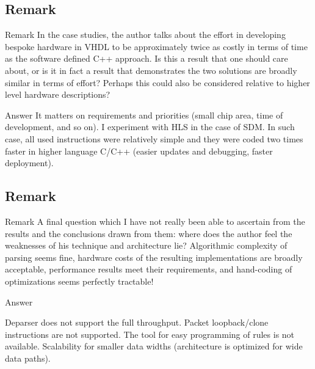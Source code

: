 \subsection{Remark \theRemarkCounter}
\begin{frame}[allowframebreaks]
    \begin{block}{Remark \theRemarkCounter}
       In the case studies, the author talks about the effort in developing bespoke hardware in
       VHDL to be approximately twice as costly in terms of time as the software defined C++
       approach. Is this a result that one should care about, or is it in fact a result that demonstrates
       the two solutions are broadly similar in terms of effort? Perhaps this could also be considered
       relative to higher level hardware descriptions?
    \end{block}
    
    \begin{exampleblock}{Answer}
        It matters on requirements and priorities (small chip area, time of development, and so on).
        I experiment with HLS in the case of SDM. In such case, all used instructions were relatively 
        simple and they were coded two times faster in higher language C/C++ (easier updates and debugging, faster deployment).
    \end{exampleblock}
\end{frame}

\subsection{Remark \theRemarkCounter}
\begin{frame}[allowframebreaks]
    \begin{block}{Remark \theRemarkCounter}
       A final question which I have not really been able to ascertain from the results and the
       conclusions drawn from them: where does the author feel the weaknesses of his technique and
       architecture lie? Algorithmic complexity of parsing seems fine, hardware costs of the resulting
       implementations are broadly acceptable, performance results meet their requirements, and
       hand-coding of optimizations seems perfectly tractable!
    \end{block}
    
    \begin{exampleblock}{Answer}
         \begin{itemize}
             \fitem Deparser does not support the full throughput.
             \fitem Packet loopback/clone instructions are not supported.
             \fitem The tool for easy programming of rules is not available.
             \fitem Scalability for smaller data widths (architecture is optimized for wide data paths).
         \end{itemize} 
    \end{exampleblock}
\end{frame}